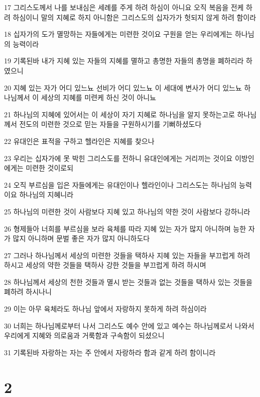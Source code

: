 \par 17 그리스도께서 나를 보내심은 세례를 주게 하려 하심이 아니요 오직 복음을 전케 하려 하심이니 말의 지혜로 하지 아니함은 그리스도의 십자가가 헛되지 않게 하려 함이라
\par 18 십자가의 도가 멸망하는 자들에게는 미련한 것이요 구원을 얻는 우리에게는 하나님의 능력이라
\par 19 기록된바 내가 지혜 있는 자들의 지혜를 멸하고 총명한 자들의 총명을 폐하리라 하였으니
\par 20 지혜 있는 자가 어디 있느뇨 선비가 어디 있느뇨 이 세대에 변사가 어디 있느뇨 하나님께서 이 세상의 지혜를 미련케 하신 것이 아니뇨
\par 21 하나님의 지혜에 있어서는 이 세상이 자기 지혜로 하나님을 알지 못하는고로 하나님께서 전도의 미련한 것으로 믿는 자들을 구원하시기를 기뻐하셨도다
\par 22 유대인은 표적을 구하고 헬라인은 지혜를 찾으나
\par 23 우리는 십자가에 못 박힌 그리스도를 전하니 유대인에게는 거리끼는 것이요 이방인에게는 미련한 것이로되
\par 24 오직 부르심을 입은 자들에게는 유대인이나 헬라인이나 그리스도는 하나님의 능력이요 하나님의 지혜니라
\par 25 하나님의 미련한 것이 사람보다 지혜 있고 하나님의 약한 것이 사람보다 강하니라
\par 26 형제들아 너희를 부르심을 보라 육체를 따라 지혜 있는 자가 많지 아니하며 능한 자가 많지 아니하며 문벌 좋은 자가 많지 아니하도다
\par 27 그러나 하나님께서 세상의 미련한 것들을 택하사 지혜 있는 자들을 부끄럽게 하려 하시고 세상의 약한 것들을 택하사 강한 것들을 부끄럽게 하려 하시며
\par 28 하나님께서 세상의 천한 것들과 멸시 받는 것들과 없는 것들을 택하사 있는 것들을 폐하려 하시나니
\par 29 이는 아무 육체라도 하나님 앞에서 자랑하지 못하게 하려 하심이라
\par 30 너희는 하나님께로부터 나서 그리스도 예수 안에 있고 예수는 하나님께로서 나와서 우리에게 지혜와 의로움과 거룩함과 구속함이 되셨으니
\par 31 기록된바 자랑하는 자는 주 안에서 자랑하라 함과 같게 하려 함이니라

\chapter{2}

